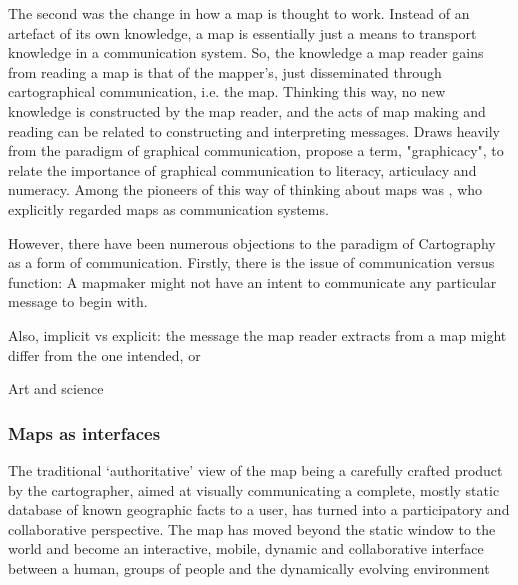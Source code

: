 The second was the change in how a map is thought to work.
Instead of an artefact of its own knowledge,
a map is essentially just a means to transport knowledge in a communication system.
So, the knowledge a map reader gains from reading a map is that of the mapper's,
just disseminated through cartographical communication, i.e. the map.
Thinking this way, no new knowledge is constructed by the map reader,  %
and the acts of map making and reading can be related to constructing and interpreting messages.
Draws heavily from the paradigm of graphical communication,  %
\textcite{bal1966} propose a term, "graphicacy",
to relate the importance of graphical communication to literacy, articulacy and numeracy.
Among the pioneers of this way of thinking about maps was \textcite{kol1969},
who explicitly regarded maps as communication systems.

However, there have been numerous objections to the paradigm of Cartography as a form of communication.
Firstly, there is the issue of communication versus function:
A mapmaker might not have an intent to communicate any particular message to begin with.

Also, implicit vs explicit:
the message the map reader extracts from a map might differ from the one intended, or


Art and science \parencite{mac2004, tyn1992}  %






\subsubsection{Maps as interfaces}

\parencite{kra2017}
The traditional ‘authoritative’ view of the map being a carefully crafted product
by the cartographer, aimed at visually communicating a complete, mostly static database
of known geographic facts to a user, has turned into a participatory and collaborative perspective.
The map has moved beyond the static window to the world and become an
interactive, mobile, dynamic and collaborative interface between a human, groups of
people and the dynamically evolving environment


